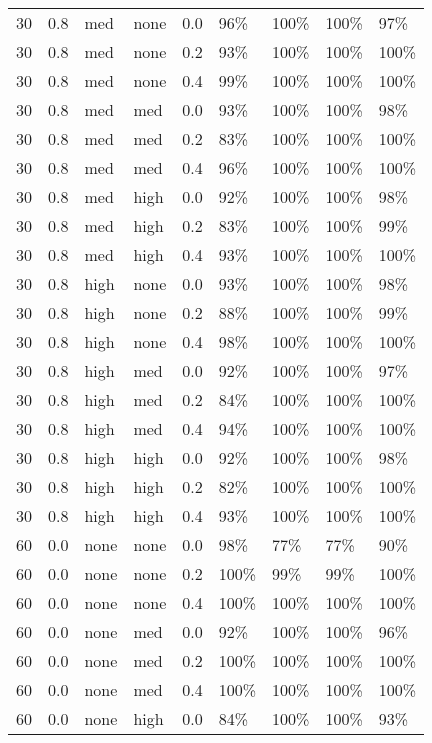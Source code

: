 \begin{longtable}{rrllrllll}
  30 & 0.8 & med & none & 0.0 & 96\% & 100\% & 100\% & 97\% \\ 
  30 & 0.8 & med & none & 0.2 & 93\% & 100\% & 100\% & 100\% \\ 
  30 & 0.8 & med & none & 0.4 & 99\% & 100\% & 100\% & 100\% \\ 
  30 & 0.8 & med & med & 0.0 & 93\% & 100\% & 100\% & 98\% \\ 
  30 & 0.8 & med & med & 0.2 & 83\% & 100\% & 100\% & 100\% \\ 
  30 & 0.8 & med & med & 0.4 & 96\% & 100\% & 100\% & 100\% \\ 
  30 & 0.8 & med & high & 0.0 & 92\% & 100\% & 100\% & 98\% \\ 
  30 & 0.8 & med & high & 0.2 & 83\% & 100\% & 100\% & 99\% \\ 
  30 & 0.8 & med & high & 0.4 & 93\% & 100\% & 100\% & 100\% \\ 
  30 & 0.8 & high & none & 0.0 & 93\% & 100\% & 100\% & 98\% \\ 
  30 & 0.8 & high & none & 0.2 & 88\% & 100\% & 100\% & 99\% \\ 
  30 & 0.8 & high & none & 0.4 & 98\% & 100\% & 100\% & 100\% \\ 
  30 & 0.8 & high & med & 0.0 & 92\% & 100\% & 100\% & 97\% \\ 
  30 & 0.8 & high & med & 0.2 & 84\% & 100\% & 100\% & 100\% \\ 
  30 & 0.8 & high & med & 0.4 & 94\% & 100\% & 100\% & 100\% \\ 
  30 & 0.8 & high & high & 0.0 & 92\% & 100\% & 100\% & 98\% \\ 
  30 & 0.8 & high & high & 0.2 & 82\% & 100\% & 100\% & 100\% \\ 
  30 & 0.8 & high & high & 0.4 & 93\% & 100\% & 100\% & 100\% \\ 
  60 & 0.0 & none & none & 0.0 & 98\% & 77\% & 77\% & 90\% \\ 
  60 & 0.0 & none & none & 0.2 & 100\% & 99\% & 99\% & 100\% \\ 
  60 & 0.0 & none & none & 0.4 & 100\% & 100\% & 100\% & 100\% \\ 
  60 & 0.0 & none & med & 0.0 & 92\% & 100\% & 100\% & 96\% \\ 
  60 & 0.0 & none & med & 0.2 & 100\% & 100\% & 100\% & 100\% \\ 
  60 & 0.0 & none & med & 0.4 & 100\% & 100\% & 100\% & 100\% \\ 
  60 & 0.0 & none & high & 0.0 & 84\% & 100\% & 100\% & 93\% \\ 

\end{longtable}
